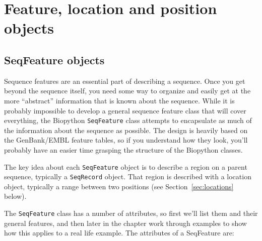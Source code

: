 \section{Feature, location and position objects}
\label{sec:seq_features}

\subsection{SeqFeature objects}

Sequence features are an essential part of describing a sequence. Once you get beyond the sequence itself, you need some way to organize and easily get at the more ``abstract'' information that is known about the sequence. While it is probably impossible to develop a general sequence feature class that will cover everything, the Biopython \verb|SeqFeature| class attempts to encapsulate as much of the information about the sequence as possible. The design is heavily based on the GenBank/EMBL feature tables, so if you understand how they look, you'll probably have an easier time grasping the structure of the Biopython classes.

The key idea about each \verb|SeqFeature| object is to describe a region on a parent sequence, typically a \verb|SeqRecord| object. That region is described with a location object, typically a range between two positions (see Section~\ref{sec:locations} below).

The \verb|SeqFeature| class has a number of attributes, so first we'll list them and their general features, and then later in the chapter work through examples to show how this applies to a real life example. The attributes of a SeqFeature are:

